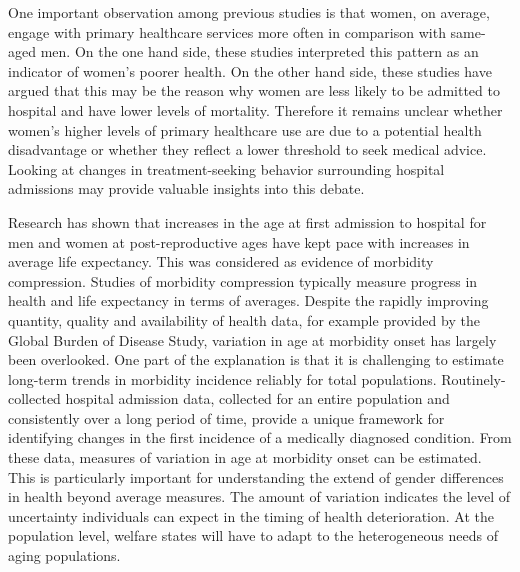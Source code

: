One important observation among previous studies is that women, on average, 
engage with primary healthcare services more often in comparison with 
same-aged men.\citep{case2005sex,juel2008men,oksuzyan2008,wang2013men,
banks2013men,wang2014gender} On the one hand side, these studies interpreted 
this pattern as an indicator of women's poorer health. On the other 
hand side, these studies have argued that this may be the reason why 
women are less likely to be admitted to hospital and have lower levels 
of mortality. Therefore it remains unclear whether women's 
higher levels of primary healthcare use are due to a potential health 
disadvantage or whether they reflect a lower threshold to seek medical 
advice.\citep{hunt2011women} Looking at changes in treatment-seeking 
behavior surrounding hospital admissions may provide valuable insights 
into this debate.

Research has shown that increases in the age at first admission to 
hospital for men and women at post-reproductive ages have kept pace 
with increases in average life expectancy.\citep{karampampa2013trends} 
This was considered as evidence of morbidity compression. Studies 
of morbidity compression typically measure progress in health and 
life expectancy in terms of averages.\citep{colvez1983potential,
robine1999health,beltran2015past,salomon2012healthy,crimmins2016trends} 
Despite the rapidly improving quantity, quality and availability 
of health data, for example provided by the Global Burden of Disease 
Study,\citep{global2019} variation in age at morbidity onset has largely been overlooked. 
One part of the explanation is that it is challenging to estimate 
long-term trends in morbidity incidence reliably for total 
populations.\citep{modig2013age,modig2017estimating,modig2019temporal}
Routinely-collected hospital admission data, collected for an entire 
population and consistently over a long period of time, provide a unique 
framework for identifying changes in the first incidence of a medically 
diagnosed condition.\citep{lynch2007use,karampampa2013trends,westergaard2019population,
jensen2014temporal} From these data, measures of variation in 
age at morbidity onset can be estimated. This is particularly 
important for understanding the extend of gender differences 
in health beyond average measures. The amount of variation indicates the level 
of uncertainty individuals can expect in the timing of health deterioration.\citep{van2018case}
At the population level, welfare states will have to adapt to the heterogeneous 
needs of aging populations.\citep{van2014lifespan,sasson2016trends,van2018case} 

